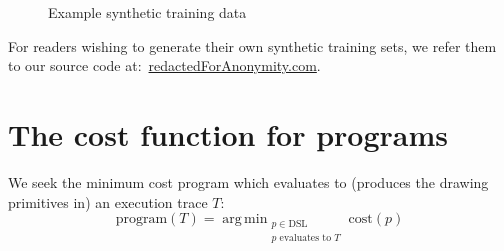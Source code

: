 \documentclass{article}
\DeclareMathOperator*{\argmin}{arg\,min} %
\DeclareMathOperator{\argmin}{argmin} %
\begin{document}
\begin{figure}
      \begin{minipage}[t]{2.2cm}\end{minipage}
      \begin{minipage}[t]{2.2cm}\end{minipage}
      \begin{minipage}[t]{2.2cm}\end{minipage}
      \begin{minipage}[t]{2.2cm}\end{minipage}
      \caption{Example synthetic training data}\label{exampleTrainingData}
\end{figure}

For readers wishing to generate their own synthetic training sets,
we refer them to our source code at:~\url{redactedForAnonymity.com}.%

\section{The cost function for programs}

We seek the minimum cost program which evaluates to (produces the drawing primitives in) an execution trace $T$:
\begin{equation}
  \text{program}(T) = \argmin_{\substack{p\in \text{DSL}\\p \text{ evaluates to } T}} \text{cost}(p)\label{programObjective}
\end{equation}
\end{document}
